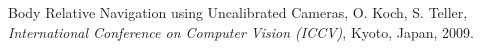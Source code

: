 \documentclass[letter,11pt]{report}
\begin{document}
\noindent Body Relative Navigation using Uncalibrated Cameras, O. Koch, S. Teller, {\it International Conference on Computer Vision (ICCV)}, Kyoto, Japan, 2009.


%
%
%
%
%
%
%
%
%
%
\end{document}
